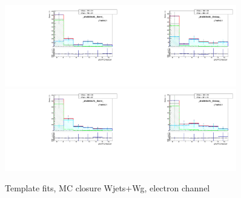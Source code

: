 \begin{figure}[htb]
\begin{center}
   \includegraphics[width=0.45\textwidth]{../figs/figs_v11/ELECTRON_WGamma/MCclosureWjetsPlusWg/c_TEMPL_CHISO_UNblind__phoEt55to65__Barrel__RooFit_MCclosure.pdf}\includegraphics[width=0.45\textwidth]{../figs/figs_v11/ELECTRON_WGamma/MCclosureWjetsPlusWg/c_TEMPL_CHISO_UNblind__phoEt55to65__Endcap__RooFit_MCclosure.pdf}\\
   \includegraphics[width=0.45\textwidth]{../figs/figs_v11/ELECTRON_WGamma/MCclosureWjetsPlusWg/c_TEMPL_CHISO_UNblind__phoEt65to75__Barrel__RooFit_MCclosure.pdf}\includegraphics[width=0.45\textwidth]{../figs/figs_v11/ELECTRON_WGamma/MCclosureWjetsPlusWg/c_TEMPL_CHISO_UNblind__phoEt65to75__Endcap__RooFit_MCclosure.pdf}\\
  \label{fig:templateFits_MCclosureWjetsPlusWg_CHISO_ELECTRON_2}
  \caption{Template fits, MC closure Wjets+Wg, electron channel}
  \end{center}
\end{figure}

